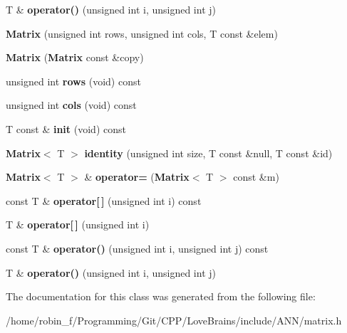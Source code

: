 \begin{DoxyCompactItemize}
\item 
T \& {\bfseries operator()} (unsigned int i, unsigned int j)\label{class_g_a_n_n_1_1_matrix_ac3f7f2d7467ba5bc95fca1890be74a38}

\item 
{\bfseries Matrix} (unsigned int rows, unsigned int cols, T const \&elem)\label{class_g_a_n_n_1_1_matrix_a370ad3ace72e48cf5ac3d2fd672dd679}

\item 
{\bfseries Matrix} ({\bf Matrix} const \&copy)\label{class_g_a_n_n_1_1_matrix_a9af1de05104cf864d0089575e772b74b}

\item 
unsigned int {\bfseries rows} (void) const \label{class_g_a_n_n_1_1_matrix_a14c1233ee25f1cd5823676277e1956f2}

\item 
unsigned int {\bfseries cols} (void) const \label{class_g_a_n_n_1_1_matrix_adc449f757249fe5bfc5bdae3c809d7e7}

\item 
T const \& {\bfseries init} (void) const \label{class_g_a_n_n_1_1_matrix_a5369d9c2dc7ae6a0941f1aba36f15259}

\item 
{\bf Matrix}$<$ T $>$ {\bfseries identity} (unsigned int size, T const \&null, T const \&id)\label{class_g_a_n_n_1_1_matrix_ae61ef07a101463ad49ab8f9f7dd4f2fe}

\item 
{\bf Matrix}$<$ T $>$ \& {\bfseries operator=} ({\bf Matrix}$<$ T $>$ const \&m)\label{class_g_a_n_n_1_1_matrix_a0aa93d1a66567637deb98c943f936fd4}

\item 
const T \& {\bfseries operator[$\,$]} (unsigned int i) const \label{class_g_a_n_n_1_1_matrix_add9f200cb6a2e53709090621e3a1150a}

\item 
T \& {\bfseries operator[$\,$]} (unsigned int i)\label{class_g_a_n_n_1_1_matrix_a700ad2c1e9ab4fd76fe1cb18092a80f1}

\item 
const T \& {\bfseries operator()} (unsigned int i, unsigned int j) const \label{class_g_a_n_n_1_1_matrix_aa3bef5292a718f45e094926602ff65ca}

\item 
T \& {\bfseries operator()} (unsigned int i, unsigned int j)\label{class_g_a_n_n_1_1_matrix_ac3f7f2d7467ba5bc95fca1890be74a38}

\end{DoxyCompactItemize}


The documentation for this class was generated from the following file\+:\begin{DoxyCompactItemize}
\item 
/home/robin\+\_\+f/\+Programming/\+Git/\+C\+P\+P/\+Love\+Brains/include/\+A\+N\+N/matrix.\+h\end{DoxyCompactItemize}
